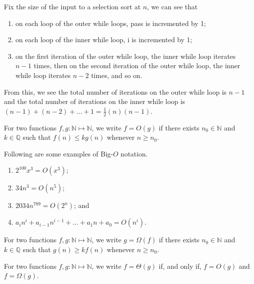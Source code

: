 \begin{example}
    Fix the size of the input to a selection sort at $n$, we can see that
    \begin{enumerate}
        \item on each loop of the outer while loops, pass is incremented by 1;
        \item on each loop of the inner while loop, i is incremented by 1;
        \item on the first iteration of the outer while loop, the inner while loop iterates $n-1$ times, then on the second iteration of the outer while loop, the inner while loop iterates $n-2$ times, and so on.
    \end{enumerate}
    From this, we see the total number of iterations on the outer while loop is $n-1$ and the total number of iterations on the inner while loop is $(n-1)+(n-2)+\ldots+1=\frac12(n)(n-1)$.
\end{example}

\begin{definition}
    For two functions $f,g:\mathbb N\mapsto\mathbb N$, we write $f=O(g)$ if there exists $n_0\in\mathbb N$ and $k\in\mathbb Q$ such that $f(n)\leq kg(n)$ whenever $n\geq n_0$.
\end{definition}

\begin{example}
    Following are some examples of Big-$O$ notation.
    
    \begin{enumerate}
        \item $2^{100}x^3=O(x^3)$;
        \item $34n^3=O(n^5)$; 
        \item $2034n^{789}=O(2^n)$; and
        \item $a_in^i+a_{i-1}n^{i-1}+\ldots+a_1n+a_0=O(n^i)$.
    \end{enumerate}
\end{example}

\begin{definition}
    For two functions $f,g:\mathbb N\mapsto\mathbb N$, we write $g=\Omega(f)$ if there exists $n_0\in\mathbb N$ and $k\in\mathbb Q$ such that $g(n)\geq kf(n)$ whenever $n\geq n_0$.
\end{definition}

\begin{definition}
    For two functions $f,g:\mathbb N\mapsto\mathbb N$, we write $f=\Theta(g)$ if, and only if, $f=O(g)$ and $f=\Omega(g)$.
\end{definition}
